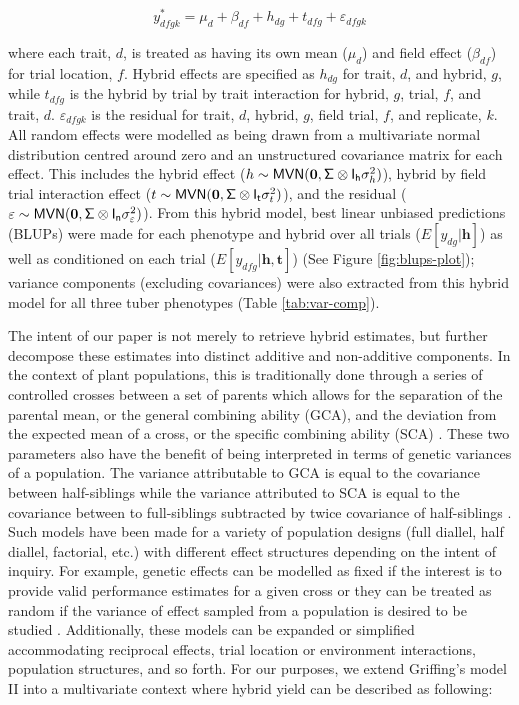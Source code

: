 \begin{refsection}
\begin{equation}
y_{dfgk}^* = \mu_d + \beta_{df} + h_{dg} + t_{dfg} + \varepsilon_{dfgk}
\label{eq:hybrid}
\end{equation}

where each trait, \(d\), is treated as having its own mean (\(\mu_d\)) and field effect (\(\beta_{df}\)) for trial location, \(f\). Hybrid effects are specified as \(h_{dg}\) for trait, \(d\), and hybrid, \(g\), while \(t_{dfg}\) is the hybrid by trial by trait interaction for hybrid, \(g\), trial, \(f\), and trait, \(d\). \(\varepsilon_{dfgk}\) is the residual for trait, \(d\), hybrid, \(g\), field trial, \(f\), and replicate, \(k\). All random effects were modelled as being drawn from a multivariate normal distribution centred around zero and an unstructured covariance matrix for each effect. This includes the hybrid effect (\(h\sim \mathsf{MVN}({\bf 0},\mathsf{\Sigma\otimes I_h} \sigma_h^2)\)), hybrid by field trial interaction effect (\(t\sim \mathsf{MVN}({\bf 0},\mathsf{\Sigma\otimes I_t}\sigma_t^2)\)), and the residual (\(\varepsilon \sim \mathsf{MVN}({\bf 0},\mathsf{\Sigma\otimes I_n}\sigma_\varepsilon^2)\)). From this hybrid model, best linear unbiased predictions (BLUPs) were made for each phenotype and hybrid over all trials (\(E[y_{dg}|\mathbf{h}]\)) as well as conditioned on each trial (\(E[y_{dfg}|\mathbf{h},\mathbf{t}]\)) (See Figure \ref{fig:blups-plot}); variance components (excluding covariances) were also extracted from this hybrid model for all three tuber phenotypes (Table \ref{tab:var-comp}).

The intent of our paper is not merely to retrieve hybrid estimates, but further decompose these estimates into distinct additive and non-additive components. In the context of plant populations, this is traditionally done through a series of controlled crosses between a set of parents which allows for the separation of the parental mean, or the general combining ability (GCA), and the deviation from the expected mean of a cross, or the specific combining ability (SCA) \parencite{Sprague1942}. These two parameters also have the benefit of being interpreted in terms of genetic variances of a population. The variance attributable to GCA is equal to the covariance between half-siblings while the variance attributed to SCA is equal to the covariance between to full-siblings subtracted by twice covariance of half-siblings \parencite{Bernardo2002}. Such models have been made for a variety of population designs (full diallel, half diallel, factorial, etc.) with different effect structures depending on the intent of inquiry. For example, genetic effects can be modelled as fixed if the interest is to provide valid performance estimates for a given cross or they can be treated as random if the variance of effect sampled from a population is desired to be studied \parencite{Eisenhart1947}. Additionally, these models can be expanded or simplified accommodating reciprocal effects, trial location or environment interactions, population structures, and so forth. For our purposes, we extend Griffing's model II \parencite{Griffing1956} into a multivariate context where hybrid yield can be described as following:


\end{refsection}
